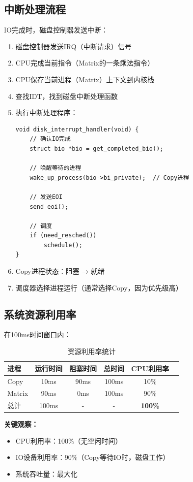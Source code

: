 \documentclass[UTF8,a4paper,12pt]{ctexart}
\begin{document}
\subsection{中断处理流程}

IO完成时，磁盘控制器发送中断：

\begin{enumerate}[leftmargin=2em]
    \item 磁盘控制器发送IRQ（中断请求）信号
    \item CPU完成当前指令（Matrix的一条乘法指令）
    \item CPU保存当前进程（Matrix）上下文到内核栈
    \item 查找IDT，找到磁盘中断处理函数
    \item 执行中断处理程序：
    \begin{lstlisting}[style=cstyle]
void disk_interrupt_handler(void) {
    // 确认IO完成
    struct bio *bio = get_completed_bio();

    // 唤醒等待的进程
    wake_up_process(bio->bi_private);  // Copy进程

    // 发送EOI
    send_eoi();

    // 调度
    if (need_resched())
        schedule();
}
    \end{lstlisting}
    \item Copy进程状态：阻塞 → 就绪
    \item 调度器选择进程运行（通常选择Copy，因为优先级高）
\end{enumerate}

\subsection{系统资源利用率}

在100ms时间窗口内：

\begin{table}[H]
\centering
\caption{资源利用率统计}
\begin{tabular}{lccccc}
\toprule
\textbf{进程} & \textbf{运行时间} & \textbf{阻塞时间} & \textbf{总时间} & \textbf{CPU利用率} \\
\midrule
Copy & 10ms & 90ms & 100ms & 10\% \\
Matrix & 90ms & 0ms & 100ms & 90\% \\
\midrule
总计 & 100ms & - & - & \textbf{100\%} \\
\bottomrule
\end{tabular}
\end{table}

\textbf{关键观察：}
\begin{itemize}
    \item CPU利用率：100\%（无空闲时间）
    \item IO设备利用率：90\%（Copy等待IO时，磁盘工作）
    \item 系统吞吐量：最大化
\end{itemize}
\end{document}

